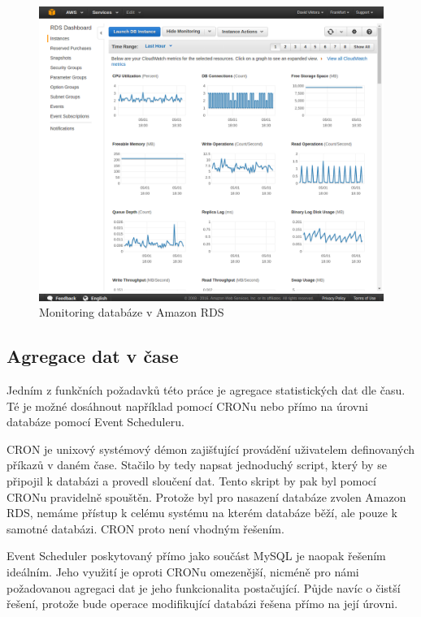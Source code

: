 \documentclass[thesis=B,czech]{FITthesis}[2012/06/26]
\begin{document}
\begin{figure}[h]
   	\centering
   	\includegraphics[width=1\textwidth]{images/aws-monitoring.png}
   	\caption{Monitoring databáze v Amazon RDS}
   	\label{fig:aws_monitoring}
\end{figure}
	
\subsection{Agregace dat v čase}
\label{agregace-dat}
	Jedním z funkčních požadavků této práce je agregace statistických dat dle času. Té je možné dosáhnout například pomocí CRONu nebo přímo na úrovni databáze pomocí Event Scheduleru. 
	
	CRON je unixový systémový démon zajišťující provádění uživatelem definovaných příkazů v daném čase. Stačilo by tedy napsat jednoduchý script, který by se připojil k databázi a provedl sloučení dat. Tento skript by pak byl pomocí CRONu pravidelně spouštěn. Protože byl pro nasazení databáze zvolen Amazon RDS, nemáme přístup k celému systému na kterém databáze běží, ale pouze k samotné databázi. CRON proto není vhodným řešením. 
	
	Event Scheduler poskytovaný přímo jako součást MySQL je naopak řešením ideálním. Jeho využití je oproti CRONu omezenější, nicméně pro námi požadovanou agregaci dat je jeho funkcionalita postačující. Půjde navíc o čistší řešení, protože bude operace modifikující databázi řešena přímo na její úrovni. 
	
\end{document}
